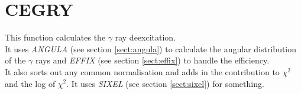 \section{CEGRY}
\label{sect:cegry}

\noindent This function calculates the $\gamma$ ray deexcitation.\\

\noindent It uses {\em ANGULA} (see section \ref{sect:angula}) to
calculate the angular distribution of the $\gamma$ rays and {\em
EFFIX} (see section \ref{sect:effix}) to handle the efficiency.\\

\noindent It also sorts out any common normalisation and adds in the
contribution to $\chi^2$ and the log of $\chi^2$. It uses {\em SIXEL}
(see section \ref{sect:sixel}) for something.\\

